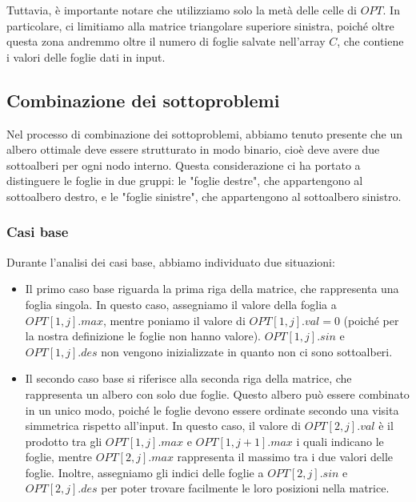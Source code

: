 Tuttavia, è importante notare che utilizziamo solo la metà delle celle di $OPT$. In particolare,
ci limitiamo alla matrice triangolare superiore sinistra, poiché oltre questa 
zona andremmo oltre il numero di foglie salvate nell'array $C$, che contiene i valori delle foglie dati in input.

\subsection{Combinazione dei sottoproblemi}

Nel processo di combinazione dei sottoproblemi, abbiamo tenuto presente che un albero ottimale deve essere strutturato in modo binario, cioè deve avere due 
sottoalberi per ogni nodo interno. Questa considerazione ci ha portato a distinguere le foglie in due gruppi: le "foglie destre", che appartengono al sottoalbero 
destro, e le "foglie sinistre", che appartengono al sottoalbero sinistro.

\subsubsection*{Casi base}

Durante l'analisi dei casi base, abbiamo individuato due situazioni:

\begin{itemize}
  \item {
    Il primo caso base riguarda la prima riga della matrice, che rappresenta una foglia singola. In questo caso, assegniamo il valore della foglia a $OPT[1, j].max$, 
    mentre poniamo il valore di $OPT[1, j].val = 0$ (poiché per la nostra definizione le foglie non hanno valore). $OPT[1, j].sin$ e $OPT[1, j].des$ non vengono inizializzate in quanto 
    non ci sono sottoalberi.
  }
  \item {
    Il secondo caso base si riferisce alla seconda riga della matrice, che rappresenta un albero con solo due foglie. Questo albero può essere combinato in un 
    unico modo, poiché le foglie devono essere ordinate secondo una visita simmetrica rispetto all'input. In questo caso, il valore di $OPT[2, j].val$ è il prodotto tra 
    gli $OPT[1, j].max$ e $OPT[1, j + 1].max$ i quali indicano le foglie, mentre $OPT[2, j].max$ rappresenta il massimo tra i due valori delle foglie. Inoltre, assegniamo gli indici delle foglie a $OPT[2, j].sin$ e $OPT[2, j].des$ 
    per poter trovare facilmente le loro posizioni nella matrice.
  }
\end{itemize}

